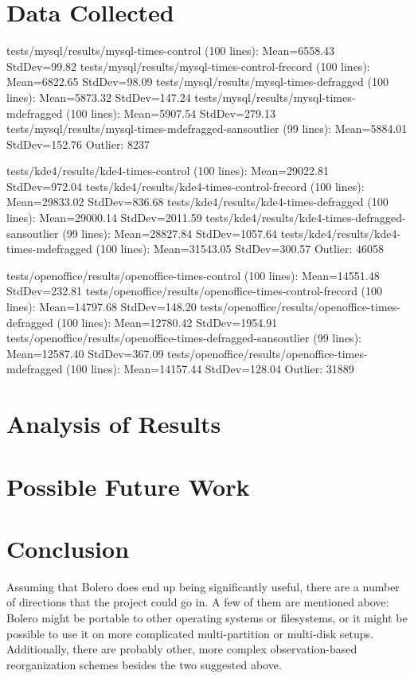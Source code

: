 \documentclass[10pt]{article}
\begin{document}
\section{Data Collected}

tests/mysql/results/mysql-times-control (100 lines):  Mean=6558.43  StdDev=99.82
tests/mysql/results/mysql-times-control-frecord (100 lines):  Mean=6822.65  StdDev=98.09
tests/mysql/results/mysql-times-defragged (100 lines):  Mean=5873.32  StdDev=147.24
tests/mysql/results/mysql-times-mdefragged (100 lines):  Mean=5907.54  StdDev=279.13
tests/mysql/results/mysql-times-mdefragged-sansoutlier (99 lines):  Mean=5884.01  StdDev=152.76
Outlier: 8237

tests/kde4/results/kde4-times-control (100 lines):  Mean=29022.81  StdDev=972.04
tests/kde4/results/kde4-times-control-frecord (100 lines):  Mean=29833.02  StdDev=836.68
tests/kde4/results/kde4-times-defragged (100 lines):  Mean=29000.14  StdDev=2011.59
tests/kde4/results/kde4-times-defragged-sansoutlier (99 lines):  Mean=28827.84  StdDev=1057.64
tests/kde4/results/kde4-times-mdefragged (100 lines):  Mean=31543.05  StdDev=300.57
Outlier: 46058

tests/openoffice/results/openoffice-times-control (100 lines):  Mean=14551.48  StdDev=232.81
tests/openoffice/results/openoffice-times-control-frecord (100 lines):  Mean=14797.68  StdDev=148.20
tests/openoffice/results/openoffice-times-defragged (100 lines):  Mean=12780.42  StdDev=1954.91
tests/openoffice/results/openoffice-times-defragged-sansoutlier (99 lines):  Mean=12587.40  StdDev=367.09
tests/openoffice/results/openoffice-times-mdefragged (100 lines):  Mean=14157.44  StdDev=128.04
Outlier: 31889

\section{Analysis of Results}

\section{Possible Future Work}

\section{Conclusion}

Assuming that Bolero does end up being significantly useful, there are a number of directions that
the project could go in. A few of them are mentioned above: Bolero might be portable to other
operating systems or filesystems, or it might be possible to use it on more complicated multi-partition
or multi-disk setups. Additionally, there are probably other, more complex observation-based reorganization schemes
besides the two suggested above.
\end{document}

